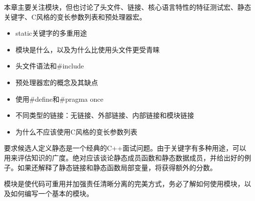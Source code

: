 
本章主要关注模块，但也讨论了头文件、链接、核心语言特性的特征测试宏、静态关键字、C风格的变长参数列表和预处理器宏。


\begin{itemize}
\item
static关键字的多重用途

\item
模块是什么，以及为什么比使用头文件更受青睐

\item
头文件语法和\#include

\item
预处理器宏的概念及其缺点

\item
使用\#define和\#pragma once

\item
不同类型的链接：无链接、外部链接、内部链接和模块链接

\item
为什么不应该使用C风格的变长参数列表
\end{itemize}


要求候选人定义静态是一个经典的C++面试问题。由于关键字有多种用途，可以用来评估知识的广度。绝对应该谈论静态成员函数和静态数据成员，并给出好的例子。如果还解释了静态链接和静态函数局部变量，将获得额外的分数。

模块是使代码可重用并加强责任清晰分离的完美方式，务必了解如何使用模块，以及如何编写一个基本的模块。








